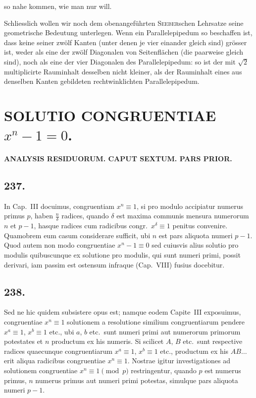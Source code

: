 \documentclass[12pt,a4paper]{article}
\begin{document}
so nahe kommen, wie man nur will.

Schliesslich wollen wir noch dem obenangef\"{u}hrten \textsc{Seeber}schen Lehrsatze seine geometrische Bedeutung unterlegen. Wenn ein Parallelepipedum so beschaffen ist, dass keine seiner zw\"{o}lf Kanten (unter denen je vier einander gleich sind) gr\"{o}sser ist, weder als eine der zw\"{o}lf Diagonalen von Seitenfl\"{a}chen (die paarweise gleich sind), noch als eine der vier Diagonalen des Parallelepipedum: so ist der mit $\sqrt{2}$ multiplicirte Rauminhalt desselben nicht kleiner, als der Rauminhalt eines aus denselben Kanten gebildeten rechtwinklichten Parallelepipedum.

\newpage
\section*{SOLUTIO CONGRUENTIAE $x^n-1=0$.}

\noindent\textbf{ANALYSIS RESIDUORUM. CAPUT SEXTUM. PARS PRIOR.}

\subsection*{237.}

In Cap.~III docuimus, congruentiam $x^n\equiv 1$, si pro modulo accipiatur numerus primus $p$, haben $\frac{n}{\delta}$ radices, quando $\delta$ est maxima communis mensura numerorum $n$ et $p-1$, hasque radices cum radicibus congr.~$x^\delta\equiv 1$ penitus convenire. Quamobrem eum casum considerare sufficit, ubi $n$ est pars aliquota numeri $p-1$. Quod autem non modo congruentiae $x^n-1\equiv 0$ sed cuiusvis alius solutio pro modulis quibuscunque ex solutione pro modulis, qui sunt numeri primi, possit derivari, iam passim est ostensum infraque (Cap.~VIII) fusius docebitur.

\subsection*{238.}

Sed ne hic quidem subsistere opus est; namque eodem Capite~III exposuimus, congruentiae $x^n\equiv 1$ solutionem a resolutione similium congruentiarum pendere $x^a\equiv 1$, $x^b\equiv 1$ etc., ubi $a$, $b$ etc.~sunt numeri primi aut numerorum primorum potestates et $n$ productum ex his numeris. Si scilicet $A$, $B$ etc.~sunt respective radices quaecunque congruentiarum $x^a\equiv 1$, $x^b\equiv 1$ etc., productum ex his $AB\ldots$ erit aliqua radicibus congruentiae $x^n\equiv 1$. Nostrae igitur investigationes ad solutionem congruentiae $x^n\equiv 1\pmod{p}$ restringentur, quando $p$ est numerus primus, $n$ numerus primus aut numeri primi potestas, simulque pars aliquota numeri $p-1$.
\end{document}
